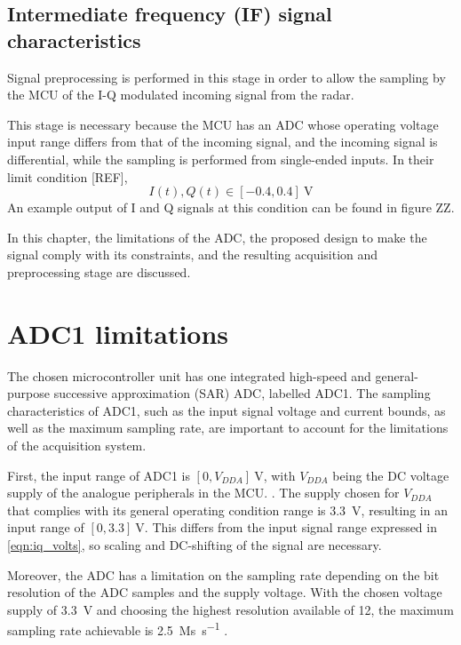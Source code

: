 \subsection{Intermediate frequency (IF) signal characteristics}

Signal preprocessing is performed in this stage in order to allow the sampling by the MCU of the I-Q modulated incoming signal from the radar.

This stage is necessary because the MCU has an ADC whose operating voltage input range differs from that of the incoming signal, and the incoming signal is differential, while the sampling is performed from single-ended inputs. In their limit condition [REF],
\begin{equation} \label{eqn:iq_volts}
	I(t), Q(t) \in [-0.4, 0.4]\ \si{\volt}
\end{equation}
An example output of I and Q signals at this condition can be found in figure ZZ.

In this chapter, the limitations of the ADC, the proposed design to make the signal comply with its constraints, and the resulting acquisition and preprocessing stage are discussed.

\section{ADC1 limitations}

The chosen microcontroller unit has one integrated high-speed and general-purpose successive approximation (SAR) ADC, labelled ADC1. The sampling characteristics of ADC1, such as the input signal voltage and current bounds, as well as the maximum sampling rate, are important to account for the limitations of the acquisition system.

First, the input range of ADC1 is $[0, V_{DDA}]\ \si{\volt}$, with $V_{DDA}$ being the DC voltage supply of the analogue peripherals in the MCU.
\cite[p.~103]{STMicroelectronics2022}. The supply chosen for $V_{DDA}$ that complies with its general operating condition range \cite[p.~62]{STMicroelectronics2022} is \SI{3.3}{\volt}, resulting in an input range of $[0, 3.3]\ \si{\volt}$. This differs from the input signal range expressed in \cref{eqn:iq_volts}, so scaling and DC-shifting of the signal are necessary.

Moreover, the ADC has a limitation on the sampling rate depending on the bit resolution of the ADC samples and the supply voltage. With the chosen voltage supply of \SI{3.3}{\volt} and choosing the highest resolution available of \SI{12}{\bit}, the maximum sampling rate achievable is \SI{2.5}{\mega s\per\second} \cite[p.~103]{STMicroelectronics2022}.

